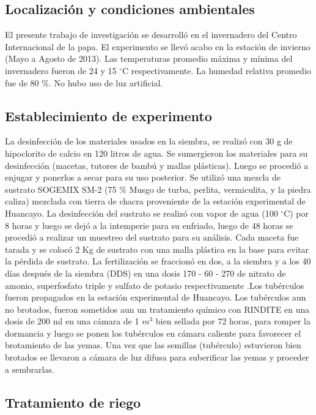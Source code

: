 \documentclass[fleqn,10pt]{Flavio}\usepackage[]{graphicx}\usepackage[]{color}
\begin{document}
\subsection{Localizaci\'on y condiciones ambientales}
	
El presente trabajo de investigaci\'on se desarroll\'o en el invernadero del Centro Internacional de la papa. El experimento se llev\'o  acabo en la estaci\'on  de invierno  (Mayo a Agosto de 2013). Las temperaturas promedio m\'axima y m\'inima  del invernadero fueron de 24 y 15 $^{\circ}$C respectivamente. La humedad relativa promedio fue de 80 \%. No hubo uso de luz artificial.
		
\subsection{Establecimiento de experimento}

La desinfecci\'on de los materiales usados en la siembra, se realiz\'o con 30 g de hipoclorito de calcio en 120 litros de agua. Se sumergieron los materiales para su desinfecci\'on (macetas, tutores de bamb\'u y mallas pl\'asticas). Luego se procedi\'o a enjugar y ponerlos a secar para su uso posterior. Se utiliz\'o una mezcla de sustrato SOGEMIX SM-2 (75 \% Musgo de turba, perlita, vermiculita, y la piedra caliza) mezclada con tierra de chacra proveniente de la estaci\'on experimental de Huancayo. La desinfecci\'on del sustrato se realiz\'o con vapor de agua (100 $^{\circ}$C) por 8 horas y luego se dej\'o a la intemperie para su enfriado, luego de 48 horas se procedi\'o a realizar un muestreo del sustrato para su an\'alisis. Cada maceta fue tarada y se coloc\'o 2 Kg de sustrato con una malla pl\'astica en la base para evitar la p\'erdida de sustrato. La fertilizaci\'on se fraccion\'o en dos, a la siembra y a los 40 d\'ias despu\'es de la siembra (DDS) en una dosis 170 - 60 - 270 de nitrato de amonio, superfosfato triple y sulfato de potasio respectivamente \citep{CIP23/06/14}.Los tub\'erculos fueron propagados en la estaci\'on experimental de Huancayo. Los tub\'erculos aun no brotados, fueron sometidos aun un tratamiento qu\'imico con RINDITE en una dosis de 200 ml en una c\'amara de 1 $m^3$ bien sellada por 72 horas, para romper la dormancia y luego se ponen los tub\'erculos en c\'amara caliente para favorecer el brotamiento de las yemas. Una vez que las semillas (tub\'erculo) estuvieron bien brotados se llevaron a c\'amara de luz difusa  para suberificar las yemas y proceder a sembrarlas.

\subsection{Tratamiento de riego}
\end{document}
